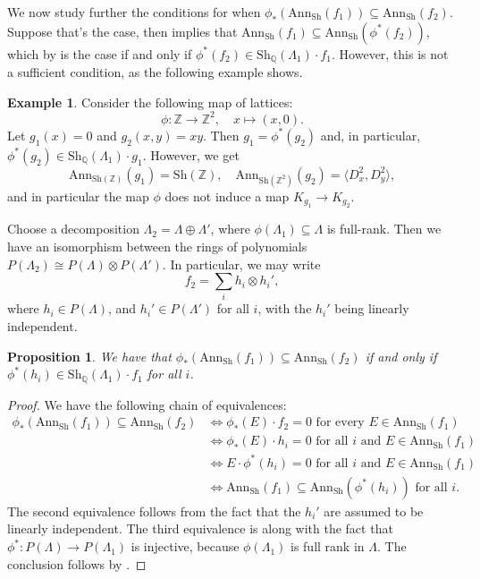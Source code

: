 \documentclass[oneside]{amsart}
\theoremstyle{plain}
\newtheorem{proposition}[theorem]{Proposition}
\theoremstyle{definition}
\newtheorem{example}[theorem]{Example}
\newcommand{\Z}{{\mathbb{Z}}}
\newcommand{\Q}{{\mathbb{Q}}}
\newcommand{\Ann}{{\mathrm{Ann}}}
\newcommand{\Sh}{{\mathrm{Sh}}}
\begin{document}
We now study further the conditions for when $\phi_*(\Ann_\Sh(f_1)) \subseteq \Ann_\Sh(f_2)$. Suppose that's the case, then  implies that $\Ann_\Sh(f_1) \subseteq \Ann_\Sh(\phi^*(f_2))$, which by  is the case if and only if $\phi^*(f_2) \in \Sh_\Q(\Lambda_1) \cdot f_1$. However, this is not a sufficient condition, as the following example shows.

\begin{example}
    Consider the following map of lattices:
\[
\phi\colon \Z \to \Z^2,\quad x\mapsto (x,0).
\]
Let $g_1(x)=0$ and $g_2(x,y) = xy$. Then  $g_1=\phi^*(g_2)$ and, in particular, 
$\phi^*(g_2) \in \Sh_\Q(\Lambda_1) \cdot g_1$. However, we get 
\[
\Ann_{\Sh(\Z)}(g_1)=\Sh(\Z),\quad \Ann_{\Sh(\Z^2)}(g_2)=\langle D_x^2,D_y^2\rangle,
\]
and in particular the map $\phi$ does not induce a map $K_{g_1}\to K_{g_2}$.
\end{example}

Choose a decomposition $\Lambda_2 = \Lambda \oplus \Lambda'$, where $\phi(\Lambda_1)\subseteq \Lambda$ is full-rank.
Then we have an isomorphism between the rings of polynomials $P(\Lambda_2) \cong P(\Lambda) \otimes P(\Lambda')$.
In particular, we may write
\[
    f_2 = \sum_{i} h_i \otimes h_i',
\]
where $h_i \in P(\Lambda)$, and $h_i' \in P(\Lambda')$ for all $i$, with the $h_i'$ being linearly independent.

\begin{proposition}\label{prop:push-forward}
We have that $\phi_*(\Ann_\Sh(f_1)) \subseteq \Ann_\Sh(f_2)$ if and only if
$\phi^*(h_i) \in \Sh_\Q(\Lambda_1)\cdot f_1$ for all $i$.
\end{proposition}

\begin{proof}
    We have the following chain of equivalences:
    \begin{align*}
        \phi_*(\Ann_\Sh(f_1)) \subseteq \Ann_\Sh(f_2) &\iff
        \phi_*(E)\cdot f_2 = 0\text{ for every }E\in \Ann_\Sh(f_1)\\
        &\iff
        \phi_*(E) \cdot h_i = 0\text{ for all }i\text{ and }E \in \Ann_\Sh(f_1)\\
        &\iff
        E \cdot \phi^*(h_i) = 0\text{ for all }i\text{ and }E \in \Ann_\Sh(f_1)\\
        &\iff
        \Ann_\Sh(f_1) \subseteq \Ann_\Sh(\phi^*(h_i))\text{ for all }i.
    \end{align*}
    The second equivalence follows from the fact that the $h_i'$ are assumed to be linearly independent. The third equivalence is  along with the fact that $\phi^*: P(\Lambda) \to P(\Lambda_1)$ is injective, because $\phi(\Lambda_1)$ is full rank in $\Lambda$.
    The conclusion follows by .
\end{proof}
\end{document}
